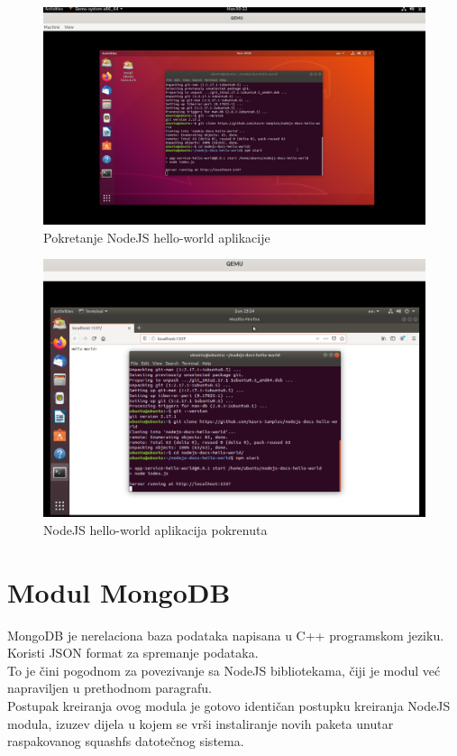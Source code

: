 \documentclass[12pt,vi]{mitthesis}
\begin{document}
\begin{figure}[!htb]
\centering
\includegraphics[width=\linewidth]{images/ModulNodeJSUbuntuTerminal.png}
\caption{Pokretanje NodeJS hello-world aplikacije}
\end{figure}
\begin{figure}[!htb]
\centering
\includegraphics[width=\linewidth]{images/ModulNodeJSUbuntu1.png}
\caption{NodeJS hello-world aplikacija pokrenuta}
\end{figure}
\section*{Modul MongoDB}
MongoDB je nerelaciona baza podataka napisana u C++ programskom jeziku. Koristi JSON format za spremanje podataka.\\
To je čini pogodnom za povezivanje sa NodeJS bibliotekama, čiji je modul već napraviljen u prethodnom paragrafu.\\
Postupak kreiranja ovog modula je gotovo identičan postupku kreiranja NodeJS modula, izuzev dijela u kojem se vrši instaliranje novih paketa unutar raspakovanog squashfs datotečnog sistema.
\end{document}
